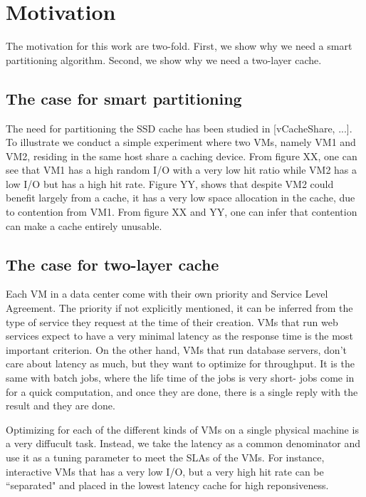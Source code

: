 
\section{Motivation}
The motivation for this work are two-fold. First, we show why we need a smart partitioning algorithm. Second, we show why we need a two-layer cache.

\subsection{The case for smart partitioning}

The need for partitioning the SSD cache has been studied in [vCacheShare, ...]. To illustrate we conduct a simple experiment where two VMs, namely VM1 and VM2, residing in the same host share a caching device. From figure XX, one can see that VM1 has a high random I/O with a very low hit ratio while VM2 has a low I/O but has a high hit rate. Figure YY, shows that despite VM2 could benefit largely from a cache, it has a very low space allocation in the cache, due to contention from VM1. From figure XX and YY, one can infer that contention can make a cache entirely unusable.

\subsection{The case for two-layer cache}

Each VM in a data center come with their own priority and Service Level Agreement. The priority if not explicitly mentioned, it can be inferred from the type of service they request at the time of their creation. VMs that run web services expect to have a very minimal latency as the response time is the most important criterion. On the other hand, VMs that run database servers, don't care about latency as much, but they want to optimize for throughput. It is the same with batch jobs, where the life time of the jobs is very short- jobs come in for a quick computation, and once they are done, there is a single reply with the result and they are done.

Optimizing for each of the different kinds of VMs on a single physical machine is a very diffucult task. Instead, we take the latency as a common denominator and use it as a tuning parameter to meet the SLAs of the VMs. For instance, interactive VMs that has a very low I/O, but a very high hit rate can be ``separated" and placed in the lowest latency cache for high reponsiveness. 
